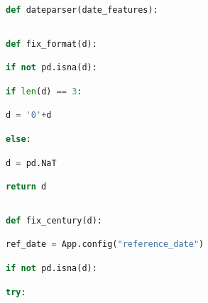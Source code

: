 \documentclass[
  11pt,
  a4paper,
  DIV=12,captions=tableheading,oneside]{scrbook}
\begin{document}
\begin{lstlisting}[language=Python,stepnumber=2,basicstyle=\footnotesize]
def dateparser(date_features):\end{lstlisting}
\begin{lstlisting}[language=Python,stepnumber=2,basicstyle=\footnotesize]
\end{lstlisting}
\begin{lstlisting}[language=Python,stepnumber=2,basicstyle=\footnotesize]
    def fix_format(d):\end{lstlisting}
\begin{lstlisting}[language=Python,stepnumber=2,basicstyle=\footnotesize]
        if not pd.isna(d):\end{lstlisting}
\begin{lstlisting}[language=Python,stepnumber=2,basicstyle=\footnotesize]
            if len(d) == 3:\end{lstlisting}
\begin{lstlisting}[language=Python,stepnumber=2,basicstyle=\footnotesize]
                d = '0'+d\end{lstlisting}
\begin{lstlisting}[language=Python,stepnumber=2,basicstyle=\footnotesize]
        else:\end{lstlisting}
\begin{lstlisting}[language=Python,stepnumber=2,basicstyle=\footnotesize]
            d = pd.NaT\end{lstlisting}
\begin{lstlisting}[language=Python,stepnumber=2,basicstyle=\footnotesize]
        return d\end{lstlisting}
\begin{lstlisting}[language=Python,stepnumber=2,basicstyle=\footnotesize]
\end{lstlisting}
\begin{lstlisting}[language=Python,stepnumber=2,basicstyle=\footnotesize]
    def fix_century(d):\end{lstlisting}
\begin{lstlisting}[language=Python,stepnumber=2,basicstyle=\footnotesize]
        ref_date = App.config("reference_date")\end{lstlisting}
\begin{lstlisting}[language=Python,stepnumber=2,basicstyle=\footnotesize]
        if not pd.isna(d):\end{lstlisting}
\begin{lstlisting}[language=Python,stepnumber=2,basicstyle=\footnotesize]
            try:\end{lstlisting}
\end{document}
